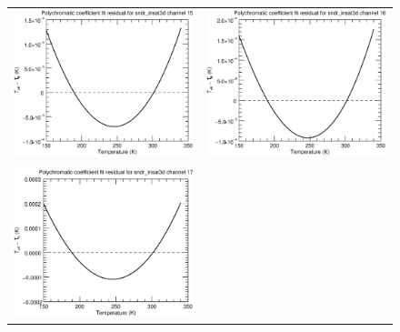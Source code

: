 \begin{figure}[H]
\begin{tabular}{c c}
    \includegraphics[scale=0.35]{graphics/sndr/tfit/sndr_insat3d-15.tfit.eps} &
    \includegraphics[scale=0.35]{graphics/sndr/tfit/sndr_insat3d-16.tfit.eps} \\\\
    \includegraphics[scale=0.35]{graphics/sndr/tfit/sndr_insat3d-17.tfit.eps} &

\end{tabular}
\end{figure}
